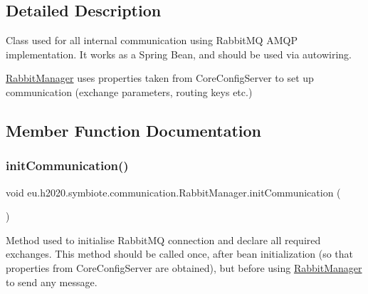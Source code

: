 \subsection{Detailed Description}
Class used for all internal communication using Rabbit\+MQ A\+M\+QP implementation. It works as a Spring Bean, and should be used via autowiring. 

\hyperlink{classeu_1_1h2020_1_1symbiote_1_1communication_1_1RabbitManager}{Rabbit\+Manager} uses properties taken from Core\+Config\+Server to set up communication (exchange parameters, routing keys etc.) 

\subsection{Member Function Documentation}
\mbox{\label{classeu_1_1h2020_1_1symbiote_1_1communication_1_1RabbitManager_a30abf6a670122eb22a8105a206858616}} 
\subsubsection{\texorpdfstring{init\+Communication()}{initCommunication()}}
{\footnotesize\ttfamily void eu.\+h2020.\+symbiote.\+communication.\+Rabbit\+Manager.\+init\+Communication (\begin{DoxyParamCaption}{ }\end{DoxyParamCaption})}

Method used to initialise Rabbit\+MQ connection and declare all required exchanges. This method should be called once, after bean initialization (so that properties from Core\+Config\+Server are obtained), but before using \hyperlink{classeu_1_1h2020_1_1symbiote_1_1communication_1_1RabbitManager}{Rabbit\+Manager} to send any message. \mbox{\label{classeu_1_1h2020_1_1symbiote_1_1communication_1_1RabbitManager_a56ce4aea24a797b642a52a3071acf0cb}} 
